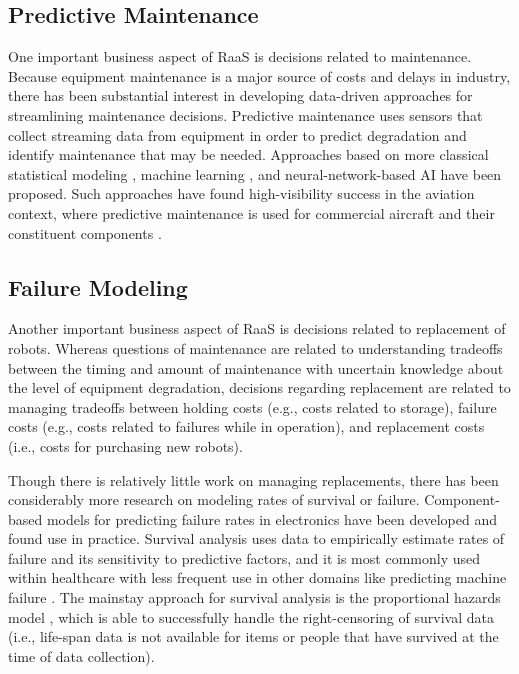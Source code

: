 \documentclass[letterpaper, 10 pt, conference]{IEEEconf}
\begin{document}
\subsection{Predictive Maintenance}

One important business aspect of RaaS is decisions related to maintenance. Because equipment maintenance is a major source of costs and delays in industry, there has been substantial interest in developing data-driven approaches for streamlining maintenance decisions. Predictive maintenance \cite{zhang2019data,carvalho2019systematic,wang2024dynamic} uses sensors that collect streaming data from equipment in order to predict degradation and identify maintenance that may be needed. Approaches based on more classical statistical modeling \cite{zhang2019data}, machine learning \cite{carvalho2019systematic}, and neural-network-based AI \cite{wang2024dynamic} have been proposed. Such approaches have found high-visibility success in the aviation context, where predictive maintenance is used for commercial aircraft and their constituent components \cite{ge_maintenance_insight}.

\subsection{Failure Modeling}

Another important business aspect of RaaS is decisions related to replacement of robots. Whereas questions of maintenance are related to understanding tradeoffs between the timing and amount of maintenance with uncertain knowledge about the level of equipment degradation, decisions regarding replacement are related to managing tradeoffs between holding costs (e.g., costs related to storage), failure costs (e.g., costs related to failures while in operation), and replacement costs (i.e., costs for purchasing new robots). 

Though there is relatively little work on managing replacements, there has been considerably more research on modeling rates of survival or failure. Component-based models for predicting failure rates in electronics have been developed \cite{mil-hdbk-217f,hinton2006prism} and found use in practice. Survival analysis \cite{vittinghoff2012regression,karim2019reliability} uses data to empirically estimate rates of failure and its sensitivity to predictive factors, and it is most commonly used within healthcare \cite{vittinghoff2012regression,collett2015modelling,eloranta2021cancer} with less frequent use in other domains like predicting machine failure \cite{karim2019reliability,papathanasiou2023machine}. The mainstay approach for survival analysis is the proportional hazards model \cite{cox1972regression,kumar1994proportional}, which is able to successfully handle the right-censoring of survival data (i.e.,  life-span data is not available for items or people that have survived at the time of data collection).
\end{document}

